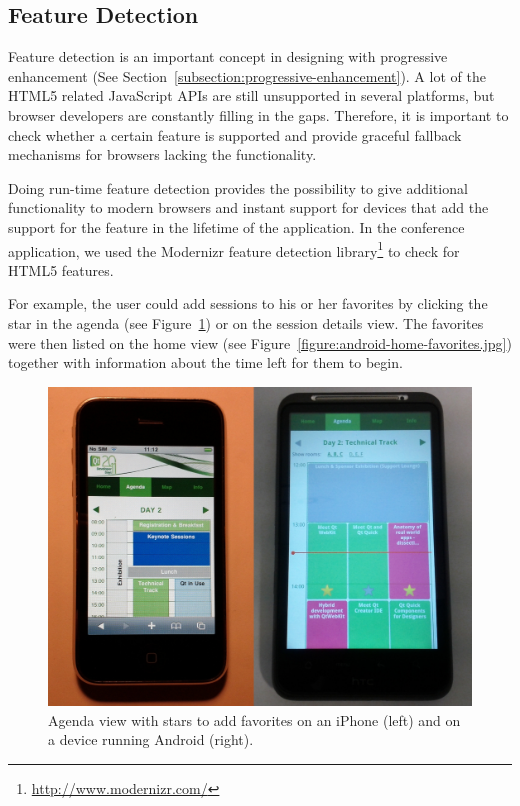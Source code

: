 \subsection{Feature Detection}
\label{section:feature-detection}

Feature detection is an important concept in designing with
progressive enhancement (See
Section~\ref{subsection:progressive-enhancement}). A lot of the HTML5
related JavaScript APIs are still unsupported in several platforms,
but browser developers are constantly filling in the gaps. Therefore,
it is important to check whether a certain feature is supported and
provide graceful fallback mechanisms for browsers lacking the
functionality.

Doing run-time feature detection provides the possibility to give
additional functionality to modern browsers and instant support for
devices that add the support for the feature in the lifetime of the
application. In the conference application, we used the Modernizr
feature detection library\footnote{\url{http://www.modernizr.com/}} to
check for HTML5 features.

For example, the user could add sessions to his or her favorites by
clicking the star in the agenda (see
Figure~\ref{figure:iphone-android-agenda.jpg}) or on the session
details view. The favorites were then listed on the home view (see
Figure~\ref{figure:android-home-favorites.jpg}) together with
information about the time left for them to begin.

\begin{figure}[ht]
  \begin{center}
    \includegraphics[width=\textwidth]{images/iphone-android-agenda.jpg}
    \caption{Agenda view with stars to add favorites on an iPhone
      (left) and on a device running Android (right).}
    \label{figure:iphone-android-agenda.jpg}
  \end{center}
\end{figure}

